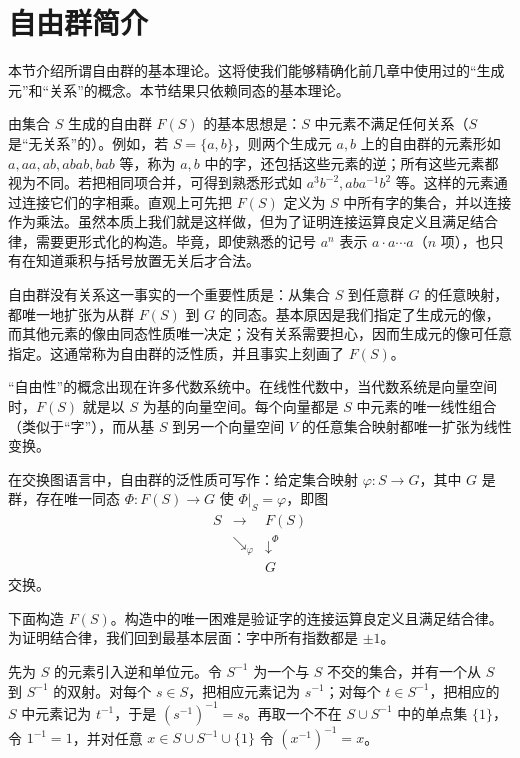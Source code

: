 \section{自由群简介}

本节介绍所谓自由群的基本理论。这将使我们能够精确化前几章中使用过的“生成元”和“关系”的概念。本节结果只依赖同态的基本理论。

由集合 $S$ 生成的自由群 $F(S)$ 的基本思想是：$S$ 中元素不满足任何关系（$S$ 是“无关系”的）。例如，若 $S=\{a,b\}$，则两个生成元 $a,b$ 上的自由群的元素形如 $a,aa,ab,abab,ba b$ 等，称为 $a,b$ 中的字，还包括这些元素的逆；所有这些元素都视为不同。若把相同项合并，可得到熟悉形式如 $a^3b^{-2},aba^{-1}b^2$ 等。这样的元素通过连接它们的字相乘。直观上可先把 $F(S)$ 定义为 $S$ 中所有字的集合，并以连接作为乘法。虽然本质上我们就是这样做，但为了证明连接运算良定义且满足结合律，需要更形式化的构造。毕竟，即使熟悉的记号 $a^n$ 表示 $a\cdot a\cdots a$（$n$ 项），也只有在知道乘积与括号放置无关后才合法。

自由群没有关系这一事实的一个重要性质是：从集合 $S$ 到任意群 $G$ 的任意映射，都唯一地扩张为从群 $F(S)$ 到 $G$ 的同态。基本原因是我们指定了生成元的像，而其他元素的像由同态性质唯一决定；没有关系需要担心，因而生成元的像可任意指定。这通常称为自由群的泛性质，并且事实上刻画了 $F(S)$。

“自由性”的概念出现在许多代数系统中。在线性代数中，当代数系统是向量空间时，$F(S)$ 就是以 $S$ 为基的向量空间。每个向量都是 $S$ 中元素的唯一线性组合（类似于“字”），而从基 $S$ 到另一个向量空间 $V$ 的任意集合映射都唯一扩张为线性变换。

在交换图语言中，自由群的泛性质可写作：给定集合映射 $\varphi:S\to G$，其中 $G$ 是群，存在唯一同态 $\Phi:F(S)\to G$ 使 $\Phi|_S=\varphi$，即图
\[
\begin{array}{ccc}
S & \longrightarrow & F(S)\\
 & \searrow_{\varphi} & \downarrow^{\Phi}\\
 & & G
\end{array}
\]
交换。

下面构造 $F(S)$。构造中的唯一困难是验证字的连接运算良定义且满足结合律。为证明结合律，我们回到最基本层面：字中所有指数都是 $\pm1$。

先为 $S$ 的元素引入逆和单位元。令 $S^{-1}$ 为一个与 $S$ 不交的集合，并有一个从 $S$ 到 $S^{-1}$ 的双射。对每个 $s\in S$，把相应元素记为 $s^{-1}$；对每个 $t\in S^{-1}$，把相应的 $S$ 中元素记为 $t^{-1}$，于是 $(s^{-1})^{-1}=s$。再取一个不在 $S\cup S^{-1}$ 中的单点集 $\{1\}$，令 $1^{-1}=1$，并对任意 $x\in S\cup S^{-1}\cup\{1\}$ 令 $(x^{-1})^{-1}=x$。


